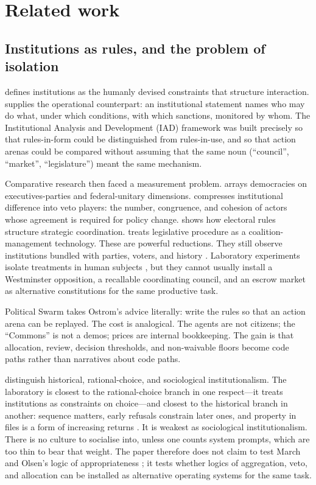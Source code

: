 \documentclass[11pt,a4paper]{article}
\begin{document}
\section{Related work}
\label{sec:related}

\subsection{Institutions as rules, and the problem of isolation}

\citet{north1990} defines institutions as the humanly devised constraints that structure
interaction. \citet{ostrom1990,ostrom2005} supplies the operational counterpart: an
institutional statement names who may do what, under which conditions, with which
sanctions, monitored by whom. The Institutional Analysis and Development (IAD) framework
was built precisely so that rules-in-form could be distinguished from rules-in-use, and
so that action arenas could be compared without assuming that the same noun (``council'',
``market'', ``legislature'') meant the same mechanism.

Comparative research then faced a measurement problem. \citet{lijphart1999} arrays
democracies on executives-parties and federal-unitary dimensions.
\citet{tsebelis1995,tsebelis2002} compresses institutional difference into veto players:
the number, congruence, and cohesion of actors whose agreement is required for policy
change. \citet{cox1997} shows how electoral rules structure strategic coordination.
\citet{martin2011} treats legislative procedure as a coalition-management technology.
These are powerful reductions. They still observe institutions bundled with parties,
voters, and history \citep{pierson2000}. Laboratory experiments isolate treatments in
human subjects \citep{druckman2006,druckman2011}, but they cannot usually install a
Westminster opposition, a recallable coordinating council, and an escrow market as
alternative constitutions for the same productive task.

Political Swarm takes Ostrom's advice literally: write the rules so that an action arena
can be replayed. The cost is analogical. The agents are not citizens; the ``Commons'' is
not a demos; prices are internal bookkeeping. The gain is that allocation, review,
decision thresholds, and non-waivable floors become code paths rather than narratives
about code paths.

\citet{hall1996} distinguish historical, rational-choice, and sociological
institutionalism. The laboratory is closest to the rational-choice branch in one
respect---it treats institutions as constraints on choice---and closest to the historical
branch in another: sequence matters, early refusals constrain later ones, and property
in files is a form of increasing returns \citep{pierson2000}. It is weakest as
sociological institutionalism. There is no culture to socialise into, unless one counts
system prompts, which are too thin to bear that weight. The paper therefore does not
claim to test March and Olsen's logic of appropriateness \citep{march1984}; it tests
whether logics of aggregation, veto, and allocation can be installed as alternative
operating systems for the same task.
\end{document}
